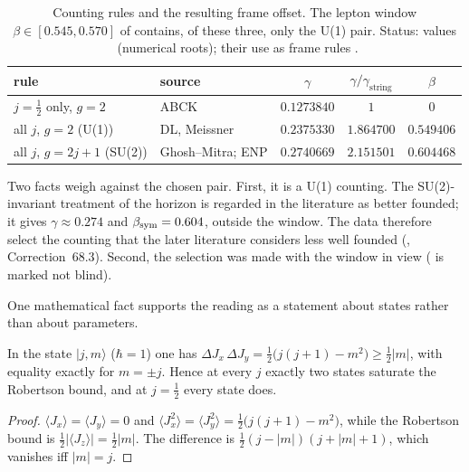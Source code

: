 \begin{table}[ht]
\centering\small
\begin{tabular}{@{}llccc@{}}
\toprule
rule & source & $\gamma$ & $\gamma/\gamma_{\mathrm{string}}$ & $\beta$\\
\midrule
$j=\tfrac12$ only, $g=2$ & ABCK \cite{ABCK1998} & $0.1273840$ & $1$ & $0$\\
all $j$, $g=2$ (U(1)) & DL, Meissner \cite{DomagalaLewandowski2004,Meissner2004} & $0.2375330$ & $1.864700$ & $0.549406$\\
all $j$, $g=2j+1$ (SU(2)) & Ghosh--Mitra; ENP \cite{GhoshMitra2005,EngleNouiPerez2010} & $0.2740669$ & $2.151501$ & $0.604468$\\
\bottomrule
\end{tabular}
\caption{Counting rules and the resulting frame offset.  The lepton window $\beta\in[0.545,0.570]$ of  contains, of these three, only the U(1)
pair.  Status: values \Established\ (numerical roots); their use as frame rules \Conditional.}
\label{tab:beta-rules}
\end{table}

Two facts weigh against the chosen pair.  First, it is a U(1) counting.  The SU(2)-invariant treatment of the horizon
\cite{EngleNouiPerez2010} is regarded in the literature as better founded; it gives $\gamma\approx0.274$ and $\beta_{\mathrm{sym}}=0.604$, outside the window.
The data therefore select the counting that the later literature considers less well founded (, Correction~68.3).  Second, the
selection was made with the window in view ( is marked not blind).

One mathematical fact supports the reading as a statement about states rather than about parameters.

\begin{proposition}
\label{prop:beta-saturation}
In the state $|j,m\rangle$ ($\hbar=1$) one has $\Delta J_x\,\Delta J_y=\tfrac12\bigl(j(j+1)-m^2\bigr)\ge\tfrac12|m|$, with equality exactly for
$m=\pm j$.  Hence at every $j$ exactly two states saturate the Robertson bound, and at $j=\tfrac12$ every state does.
\end{proposition}

\begin{proof}
$\langle J_x\rangle=\langle J_y\rangle=0$ and $\langle J_x^2\rangle=\langle J_y^2\rangle=\tfrac12\bigl(j(j+1)-m^2\bigr)$, while the Robertson bound is
$\tfrac12|\langle J_z\rangle|=\tfrac12|m|$.  The difference is $\tfrac12(j-|m|)(j+|m|+1)$, which vanishes iff $|m|=j$.
\end{proof}

